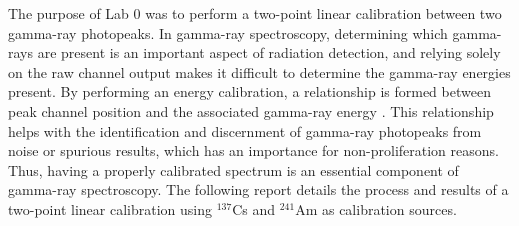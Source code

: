 The purpose of Lab 0 was to perform a two-point linear calibration between two gamma-ray photopeaks.
In gamma-ray spectroscopy, determining which gamma-rays are present is an important aspect of
radiation detection, and relying solely on the raw channel output makes it difficult to determine the gamma-ray energies
present. By performing an energy calibration, a relationship is formed between peak channel position
and the associated gamma-ray energy \cite{gilmore}. This relationship helps with the identification and discernment of
gamma-ray photopeaks from noise or spurious results, which has an
importance for non-proliferation reasons. Thus, having
a properly calibrated spectrum is an essential component of gamma-ray spectroscopy.
The following report details the process and results of a two-point linear calibration using $^{137}$Cs and $^{241}$Am as
calibration sources.
